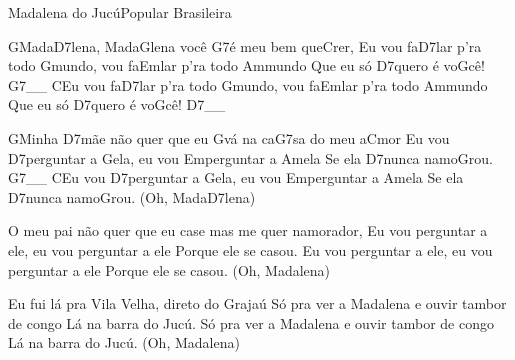 \begin{musica}{Madalena do Jucú}{Popular Brasileira}{}

\ac{G}{Ma}da\ac{D7}{le}na, Mada\ac{G}{le}na você \ac{G7}{é} meu bem que\ac{C}{rer},
Eu vou fa\ac{D7}{la}r p’ra todo \ac{G}{mun}do, vou fa\ac{Em}{lar} p’ra todo \ac{Am}{mun}do
Que eu só \ac{D7}{que}ro é vo\ac{G}{cê}! \ac{G7}{}__
\ac{C}{Eu} vou fa\ac{D7}{la}r p’ra todo \ac{G}{mun}do, vou fa\ac{Em}{lar} p’ra todo \ac{Am}{mun}do
Que eu só \ac{D7}{que}ro é vo\ac{G}{cê}! \ac{D7}{}__

\ac{G}{Mi}nha \ac{D7}{mãe} não quer que eu \ac{G}{vá} na ca\ac{G7}{sa} do meu a\ac{C}{mor}
Eu vou \ac{D7}{per}guntar a \ac{G}{e}la, eu vou \ac{Em}{per}guntar a \ac{Am}{ela}
Se ela \ac{D7}{nun}ca namo\ac{G}{rou}. \ac{G7}{}__
\ac{C}{Eu} vou \ac{D7}{per}guntar a \ac{G}{e}la, eu vou \ac{Em}{per}guntar a \ac{Am}{ela}
Se ela \ac{D7}{nun}ca namo\ac{G}{rou}. (Oh, Mada\ac{D7}{le}na)


O meu pai não quer que eu case mas me quer namorador,
Eu vou perguntar a ele, eu vou perguntar a ele
Porque ele se casou.
Eu vou perguntar a ele, eu vou perguntar a ele
Porque ele se casou. (Oh, Madalena)


Eu fui lá pra Vila Velha, direto do Grajaú
Só pra ver a Madalena e ouvir tambor de congo
Lá na barra do Jucú.
Só pra ver a Madalena e ouvir tambor de congo
Lá na barra do Jucú. (Oh, Madalena)


\end{musica}
